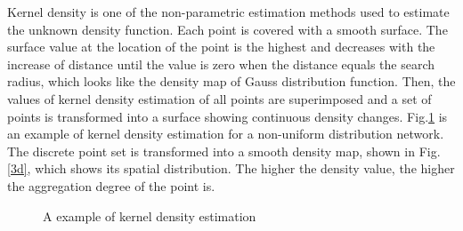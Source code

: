 \documentclass[11pt]{report}
\begin{document}
	
	\noindent \cite{reportkernel} \cite{doi:10.1080/02331880500439782}Kernel density is one of the non-parametric estimation methods used to estimate the unknown density function. Each point is covered with a smooth surface. The surface value at the location of the point is the highest and decreases with the increase of distance until the value is zero when the distance equals the search radius, which looks like the density map of Gauss distribution function. Then, the values of kernel density estimation of all points are superimposed and a set of points is transformed into a surface showing continuous density changes. Fig.\ref{fig22} is an example of kernel density estimation for a non-uniform distribution network. The discrete point set is transformed into a smooth density map, shown in Fig.\ref{3d}, which shows its spatial distribution. The higher the density value, the higher the aggregation degree of the point is.\\
	\begin{figure}[!h]
		\centering
		\caption{A example of kernel density estimation}
		\label{fig22}
	\end{figure}
\end{document}
